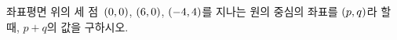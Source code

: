 좌표평면 위의 세 점~$(0{,}\mkern3mu\mathopen{}0)$, $(6{,}\mkern3mu\mathopen{}0)$, $(-4{,}\mkern3mu\mathopen{}4)$를 지나는 원의 중심의 좌표를 $(p{,}\mkern3mu\mathopen{}q)$라 할 때, $p+q$의 값을 구하시오.
